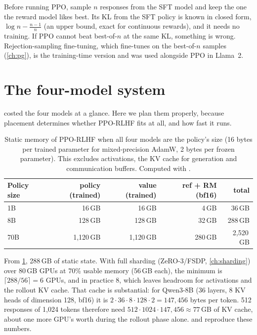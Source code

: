 \begin{keyidea}
Before running PPO, sample $n$ responses from the SFT model and keep the one the reward model
likes best. Its KL from the SFT policy is known in closed form, $\log n - \frac{n-1}{n}$
(an upper bound, exact for continuous rewards), and it needs no training. If PPO cannot beat best-of-$n$ at the
same KL, something is wrong. Rejection-sampling fine-tuning, which fine-tunes on the best-of-$n$
samples (\cref{ch:pg}), is the training-time version and was used alongside PPO in Llama~2.
\end{keyidea}

\section{The four-model system}\label{sec:rlhf:system}

 costed the four models at a glance. Here we plan them properly, because
placement determines whether PPO-RLHF fits at all, and how fast it runs.

\begin{table}[ht]
\centering\small
\begin{tabular}{@{}lrrrr@{}}
\toprule
\textbf{Policy size} & \textbf{policy (trained)} & \textbf{value (trained)} & \textbf{ref + RM (bf16)} & \textbf{total}\\
\midrule
1B  & 16\,GB   & 16\,GB   & 4\,GB   & 36\,GB\\
8B  & 128\,GB  & 128\,GB  & 32\,GB  & 288\,GB\\
70B & 1{,}120\,GB & 1{,}120\,GB & 280\,GB & 2{,}520\,GB\\
\bottomrule
\end{tabular}
\caption{Static memory of PPO-RLHF when all four models are the policy's size (16 bytes per trained
parameter for mixed-precision AdamW, 2 bytes per frozen parameter). This excludes activations, the KV
cache for generation and communication buffers. Computed with .}
\label{tab:rlhf:memory}
\end{table}

\begin{napkinmath}
From \cref{tab:rlhf:memory}, 288\,GB of static state. With full sharding (ZeRO-3/FSDP,
\cref{ch:sharding}) over 80\,GB GPUs at 70\% usable memory (56\,GB each), the minimum is
$\lceil 288/56\rceil = 6$ GPUs, and in practice 8, which leaves headroom for activations and the
rollout KV cache. That cache is substantial: for Qwen3-8B (36 layers, 8 KV heads of dimension 128, bf16) it is
$2\cdot36\cdot8\cdot128\cdot2 = 147{,}456$ bytes per token. 512 responses of 1,024 tokens
therefore need $512\cdot1024\cdot147{,}456\approx 77$\,GB of KV cache, about one more GPU's worth during
the rollout phase alone.  and  reproduce these numbers.
\end{napkinmath}

